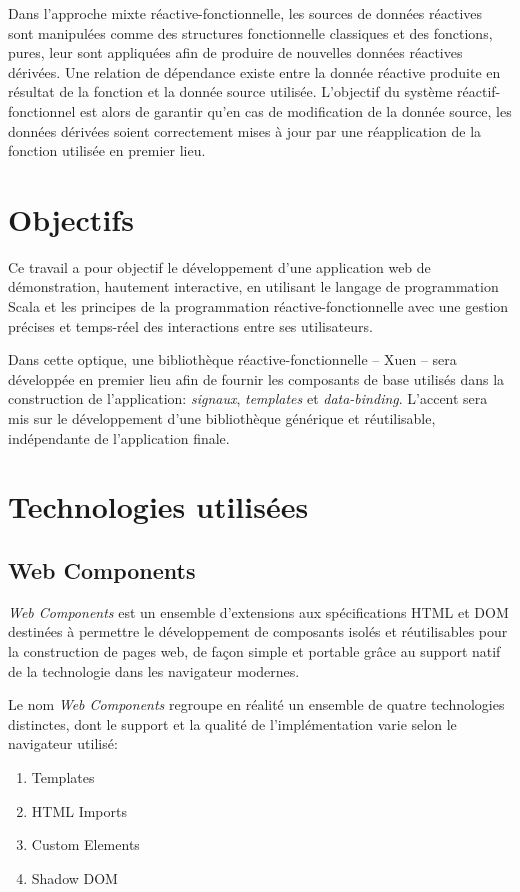 Dans l'approche mixte réactive-fonctionnelle, les sources de données réactives sont manipulées comme des structures fonctionnelle classiques et des fonctions, pures, leur sont appliquées afin de produire de nouvelles données réactives dérivées. Une relation de dépendance existe entre la donnée réactive produite en résultat de la fonction et la donnée source utilisée. L'objectif du système réactif-fonctionnel est alors de garantir qu'en cas de modification de la donnée source, les données dérivées soient correctement mises à jour par une réapplication de la fonction utilisée en premier lieu.

\section{Objectifs}

Ce travail a pour objectif le développement d'une application web de démonstration, hautement interactive, en utilisant le langage de programmation Scala et les principes de la programmation réactive-fonctionnelle avec une gestion précises et temps-réel des interactions entre ses utilisateurs.

Dans cette optique, une bibliothèque réactive-fonctionnelle -- Xuen -- sera développée en premier lieu afin de fournir les composants de base utilisés dans la construction de l'application: \emph{signaux}, \emph{templates} et \emph{data-binding}. L'accent sera mis sur le développement d'une bibliothèque générique et réutilisable, indépendante de l'application finale.

\section{Technologies utilisées}

\subsection{Web Components}

\emph{Web Components} est un ensemble d'extensions aux spécifications HTML et DOM destinées à permettre le développement de composants isolés et réutilisables pour la construction de pages web, de façon simple et portable grâce au support natif de la technologie dans les navigateur modernes.

Le nom \emph{Web Components} regroupe en réalité un ensemble de quatre technologies distinctes, dont le support et la qualité de l'implémentation varie selon le navigateur utilisé:
\begin{enumerate}
	\item Templates
	\item HTML Imports
	\item Custom Elements
	\item Shadow DOM
\end{enumerate}

